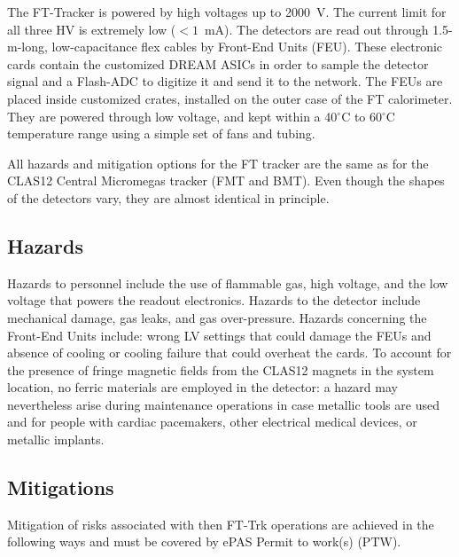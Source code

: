 The FT-Tracker is powered by high voltages up to 2000~V. The current limit for all three HV is 
extremely low ($< 1$~mA). The detectors are read out through 1.5-m-long, low-capacitance flex 
cables by Front-End Units (FEU). These electronic cards contain the customized DREAM ASICs in 
order to sample the detector signal and a Flash-ADC to digitize it and send it to the network. 
The FEUs are placed inside customized crates, installed on the outer case of the FT calorimeter. 
They are powered through low voltage, and kept within a 40$^\circ$C to 60$^\circ$C temperature 
range using a simple set of fans and tubing.

All hazards and mitigation options for the FT tracker are the same as for the CLAS12 Central 
Micromegas tracker (FMT and BMT). Even though the shapes of the detectors vary, they are almost 
identical in principle. 

\subsection{Hazards}

Hazards to personnel include the use of flammable gas, high voltage, and the low voltage that 
powers the readout electronics. Hazards to the detector include mechanical damage, gas leaks, 
and gas over-pressure. Hazards concerning the Front-End Units include: wrong LV settings that 
could damage the FEUs and absence of cooling or cooling failure that could overheat the cards. 
To account for the presence of fringe magnetic fields from the CLAS12 magnets in the system 
location, no ferric materials are employed in the detector: a hazard may nevertheless arise 
during maintenance operations in case metallic tools are used and for people with cardiac 
pacemakers, other electrical medical devices, or metallic implants.

\subsection{Mitigations}

Mitigation of risks associated with then FT-Trk operations are achieved in the following ways
and must be covered by ePAS Permit to work(s) (PTW).

